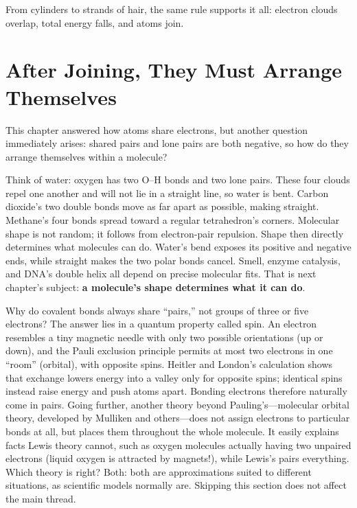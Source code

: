 From cylinders to strands of hair, the same rule supports it all: electron clouds overlap, total energy falls, and atoms join.

\section{After Joining, They Must Arrange Themselves}

This chapter answered how atoms share electrons, but another question immediately arises: shared pairs and lone pairs are both negative, so how do they arrange themselves within a molecule?

Think of water: oxygen has two O--H bonds and two lone pairs. These four clouds repel one another and will not lie in a straight line, so water is bent. Carbon dioxide's two double bonds move as far apart as possible, making  straight. Methane's four bonds spread toward a regular tetrahedron's corners. Molecular shape is not random; it follows from electron-pair repulsion. Shape then directly determines what molecules can do. Water's bend exposes its positive and negative ends, while straight  makes the two polar bonds cancel. Smell, enzyme catalysis, and DNA's double helix all depend on precise molecular fits. That is next chapter's subject: \textbf{a molecule's shape determines what it can do}.

\begin{tiaozhan}
Why do covalent bonds always share ``pairs,'' not groups of three or five electrons? The answer lies in a quantum property called spin. An electron resembles a tiny magnetic needle with only two possible orientations (up or down), and the Pauli exclusion principle permits at most two electrons in one ``room'' (orbital), with opposite spins. Heitler and London's calculation shows that exchange lowers energy into a valley only for opposite spins; identical spins instead raise energy and push atoms apart. Bonding electrons therefore naturally come in pairs. Going further, another theory beyond Pauling's---molecular orbital theory, developed by Mulliken and others---does not assign electrons to particular bonds at all, but places them throughout the whole molecule. It easily explains facts Lewis theory cannot, such as oxygen molecules actually having two unpaired electrons (liquid oxygen is attracted by magnets!), while Lewis's  pairs everything. Which theory is right? Both: both are approximations suited to different situations, as scientific models normally are. Skipping this section does not affect the main thread.
\end{tiaozhan}

